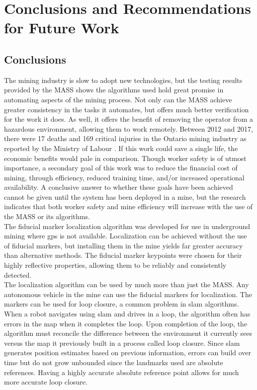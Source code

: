 \chapter{Conclusions and Recommendations for Future Work}
\label{chap:conclusions}
\section{Conclusions}
\enlargethispage{\baselineskip}
The mining industry is slow to adopt new technologies, but the testing results provided by the MASS shows the algorithms used hold great promise in automating aspects of the mining process. Not only can the MASS achieve greater consistency in the tasks it automates, but offers much better verification for the work it does. As well, it offers the benefit of removing the operator from a hazardous environment, allowing them to work remotely. Between 2012 and 2017, there were 17 deaths and 169 critical injuries in the Ontario mining industry as reported by the Ministry of Labour \cite{seebelow}. If this work could save a single life, the economic benefits would pale in comparison. Though worker safety is of utmost importance, a secondary goal of this work was to reduce the financial cost of mining, through efficiency, reduced training time, and/or increased operational availability. A conclusive answer to whether these goals have been achieved cannot be given until the system has been deployed in a mine, but the research indicates that both worker safety and mine efficiency will increase with the use of the MASS or its algorithms.\\

The fiducial marker localization algorithm was developed for use in underground mining where \acrshort{gps} is not available. Localization can be achieved without the use of fiducial markers, but installing them in the mine yields far greater accuracy than alternative methods. The fiducial marker keypoints were chosen for their highly reflective properties, allowing them to be reliably and consistently detected.\\

The localization algorithm can be used by much more than just the MASS. Any autonomous vehicle in the mine can use the fiducial markers for localization. The markers can be used for loop closure, a common problem in \acrshort{slam} algorithms. When a robot navigates using \acrshort{slam} and drives in a loop, the algorithm often has errors in the map when it completes the loop. Upon completion of the loop, the algorithm must reconcile the difference between the environment it currently sees versus the map it previously built in a process called loop closure. Since \acrshort{slam} generates position estimates based on previous information, errors can build over time but do not grow unbounded since the landmarks used are absolute references. Having a highly accurate absolute reference point allows for much more accurate loop closure.\\

